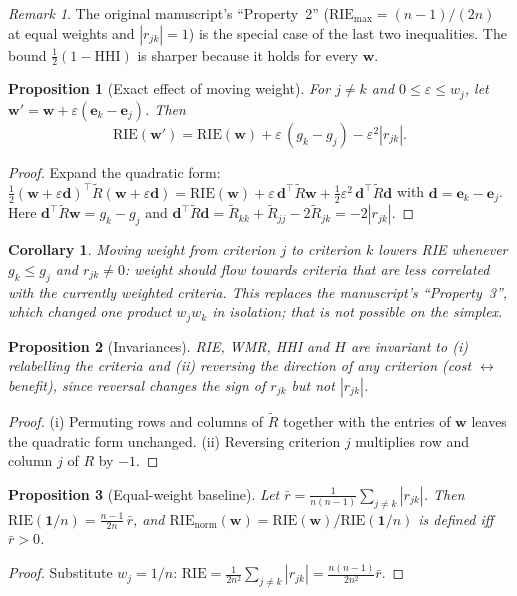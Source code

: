 \documentclass[11pt]{article}
\newtheorem{proposition}{Proposition}
\newtheorem{corollary}{Corollary}
\theoremstyle{definition}
\theoremstyle{remark}
\newtheorem{remark}{Remark}
\begin{document}
\begin{remark}
The original manuscript's ``Property~2'' ($\mathrm{RIE}_{\max}=(n-1)/(2n)$ at equal weights and
$|r_{jk}|=1$) is the special case of the last two inequalities. The bound
$\tfrac12(1-\mathrm{HHI})$ is sharper because it holds for every $\mathbf{w}$.
\end{remark}

\begin{proposition}[Exact effect of moving weight]\label{p:transfer}
For $j\ne k$ and $0\le\varepsilon\le w_j$, let $\mathbf{w}'=\mathbf{w}+\varepsilon(\mathbf{e}_k-\mathbf{e}_j)$. Then
\[
\mathrm{RIE}(\mathbf{w}')=\mathrm{RIE}(\mathbf{w})+\varepsilon\,(g_k-g_j)-\varepsilon^2|r_{jk}|.
\]
\end{proposition}
\begin{proof}
Expand the quadratic form:
$\tfrac12(\mathbf{w}+\varepsilon\mathbf{d})^{\top}\tilde R(\mathbf{w}+\varepsilon\mathbf{d})
=\mathrm{RIE}(\mathbf{w})+\varepsilon\,\mathbf{d}^{\top}\tilde R\mathbf{w}+\tfrac12\varepsilon^2\,\mathbf{d}^{\top}\tilde R\mathbf{d}$
with $\mathbf{d}=\mathbf{e}_k-\mathbf{e}_j$. Here $\mathbf{d}^{\top}\tilde R\mathbf{w}=g_k-g_j$ and
$\mathbf{d}^{\top}\tilde R\mathbf{d}=\tilde R_{kk}+\tilde R_{jj}-2\tilde R_{jk}=-2|r_{jk}|$.
\end{proof}

\begin{corollary}
Moving weight from criterion $j$ to criterion $k$ lowers RIE whenever $g_k\le g_j$ and $r_{jk}\neq 0$:
weight should flow towards criteria that are less correlated with the \emph{currently weighted} criteria.
This replaces the manuscript's ``Property~3'', which changed one product $w_jw_k$ in isolation; that
is not possible on the simplex.
\end{corollary}

\begin{proposition}[Invariances]
RIE, WMR, HHI and $H$ are invariant to (i) relabelling the criteria and (ii) reversing the direction
of any criterion (cost $\leftrightarrow$ benefit), since reversal changes the sign of $r_{jk}$ but not $|r_{jk}|$.
\end{proposition}
\begin{proof}
(i) Permuting rows and columns of $\tilde R$ together with the entries of $\mathbf{w}$ leaves the
quadratic form unchanged. (ii) Reversing criterion $j$ multiplies row and column $j$ of $R$ by $-1$.
\end{proof}

\begin{proposition}[Equal-weight baseline]\label{p:baseline}
Let $\bar r=\frac{1}{n(n-1)}\sum_{j\ne k}|r_{jk}|$. Then
$\mathrm{RIE}(\mathbf{1}/n)=\frac{n-1}{2n}\,\bar r$, and
$\mathrm{RIE}_{\mathrm{norm}}(\mathbf{w})=\mathrm{RIE}(\mathbf{w})/\mathrm{RIE}(\mathbf{1}/n)$ is defined iff $\bar r>0$.
\end{proposition}
\begin{proof}
Substitute $w_j=1/n$: $\mathrm{RIE}=\frac{1}{2n^2}\sum_{j\ne k}|r_{jk}|=\frac{n(n-1)}{2n^2}\bar r$.
\end{proof}
\end{document}
